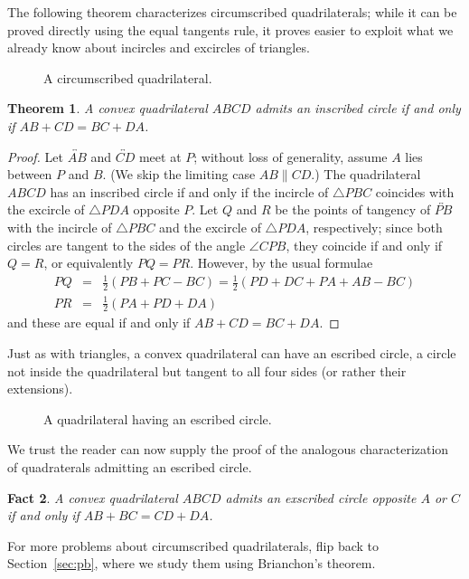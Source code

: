 \documentclass[12pt]{book}
\newcounter{exc}
\numberwithin{exc}{section}
\numberwithin{figure}{section}
\newtheorem{theorem}{Theorem}[section]
\newtheorem{fact}[theorem]{Fact}
\numberwithin{equation}{theorem}
\def\beqa{\begin{eqnarray*}}
\def\eeqa{\end{eqnarray*}}
\def\ang{\angle}
\def\half{\frac{1}{2}}
\def\line#1{\overleftrightarrow{#1}}
\begin{document}
The following theorem characterizes circumscribed quadrilaterals; 
while it can be proved directly using the equal tangents rule, it 
proves easier to exploit what we already know about incircles and 
excircles of triangles. 
\begin{figure}[ht]
\caption{A circumscribed quadrilateral.}
\end{figure}
\begin{theorem}
A convex quadrilateral $ABCD$ admits an inscribed circle if and only 
if $AB + CD = BC + DA$.
\end{theorem}
\begin{proof}
Let $\line{AB}$ and $\line{CD}$ 
meet at $P$; without loss of generality, assume $A$ lies between $P$ 
and $B$. (We skip the limiting case $AB \parallel CD$.)
The quadrilateral $ABCD$ has an inscribed circle if and only if the 
incircle of $\triangle PBC$ coincides with the excircle of 
$\triangle PDA$ opposite $P$. 
Let $Q$ and $R$ be the points of tangency of  $\line{PB}$ with 
the incircle of $\triangle PBC$ and the excircle of 
$\triangle PDA$, respectively;
since both circles are tangent to the sides of the 
angle $\ang CPB$, they coincide if and only if $Q = R$, or 
equivalently $PQ = PR$. However, by the usual formulae
\beqa
PQ &=& \half (PB + PC - BC) = \half (PD + DC + PA + AB - BC) \\
PR &=& \half (PA + PD + DA)
\eeqa
and these are equal if and only if $AB + CD = BC + DA$.
\end{proof}

Just as with triangles, a convex quadrilateral can have an escribed 
circle, a circle not inside the quadrilateral but tangent to all 
four sides (or rather their extensions). 
\begin{figure}[ht]
\caption{A quadrilateral having an escribed circle.}
\end{figure}
We trust the reader 
can now supply the proof of the analogous characterization of 
quadraterals admitting an escribed circle.
\begin{fact}
A convex quadrilateral $ABCD$ admits an exscribed circle opposite $A$ 
or $C$ if and only if $AB + BC = CD + DA$.
\end{fact}

For more problems about circumscribed quadrilaterals, flip back to 
Section~\ref{sec:pb}, where we study them using Brianchon's theorem.
\end{document}
